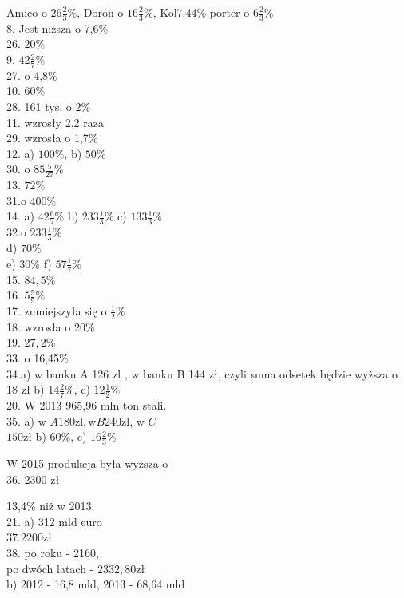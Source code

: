 \documentclass[10pt]{article}
\begin{document}
Amico o \(26 \frac{2}{3} \%\), Doron o \(16 \frac{2}{3} \%\), Kol7.44\% porter o \(6 \frac{2}{3} \%\)\\
8. Jest niższa o 7,6\%\\
26. 20\%\\
9. \(42 \frac{2}{7} \%\)\\
27. o 4,8\%\\
10. \(60 \%\)\\
28. 161 tys, o \(2 \%\)\\
11. wzrosły 2,2 raza\\
29. wzrosła o 1,7\%\\
12. a) \(100 \%\), b) \(50 \%\)\\
30. o \(85 \frac{5}{27} \%\)\\
13. \(72 \%\)\\
31.o \(400 \%\)\\
14. a) \(42 \frac{6}{7} \%\) b) \(233 \frac{1}{3} \%\) c) \(133 \frac{1}{3} \%\)\\
32.o \(233 \frac{1}{3} \%\)\\
d) \(70 \%\)\\
e) \(30 \%\) f) \(57 \frac{1}{7} \%\)\\
15. \(84,5 \%\)\\
16. \(5 \frac{5}{9} \%\)\\
17. zmniejszyła się o \(\frac{1}{2} \%\)\\
18. wzrosła o \(20 \%\)\\
19. \(27,2 \%\)\\
33. o 16,45\%\\
34.a) w banku A 126 zl , w banku B 144 zł, czyli suma odsetek będzie wyższa o 18 zł b) \(14 \frac{2}{7} \%\), c) \(12 \frac{1}{2} \%\)\\
20. W 2013 965,96 mln ton stali.\\
35. a) w \(A 180 \mathrm{zl}, \mathrm{w} B 240 \mathrm{zl}\), w \(C\)\\
\(150 \mathrm{zł}\) b) \(60 \%\), c) \(16 \frac{2}{3} \%\)

W 2015 produkcja była wyższa o\\
36. 2300 zł

13,4\% niż w 2013.\\
21. a) 312 mld euro\\
\(37.2200 \mathrm{zł}\)\\
38. po roku - 2160,\\
po dwóch latach - \(2332,80 \mathrm{zł}\)\\
b) 2012 - 16,8 mld, 2013 - 68,64 mld
\end{document}
